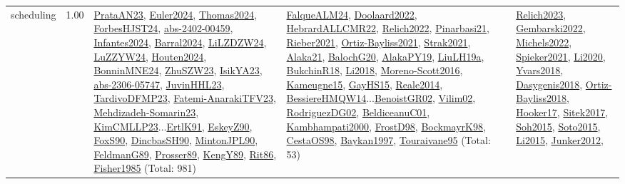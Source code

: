 {\begin{longtable}{p{3cm}r>{\raggedright\arraybackslash}p{6cm}>{\raggedright\arraybackslash}p{6cm}>{\raggedright\arraybackslash}p{8cm}}
\index{scheduling}\index{Scheduling!scheduling}scheduling &  1.00 & \hyperref[detail:PrataAN23]{PrataAN23}, \hyperref[detail:Euler2024]{Euler2024}, \hyperref[detail:Thomas2024]{Thomas2024}, \hyperref[detail:ForbesHJST24]{ForbesHJST24}, \hyperref[detail:abs-2402-00459]{abs-2402-00459}, \hyperref[detail:Infantes2024]{Infantes2024}, \hyperref[detail:Barral2024]{Barral2024}, \hyperref[detail:LiLZDZW24]{LiLZDZW24}, \hyperref[detail:LuZZYW24]{LuZZYW24}, \hyperref[detail:Houten2024]{Houten2024}, \hyperref[detail:BonninMNE24]{BonninMNE24}, \hyperref[detail:ZhuSZW23]{ZhuSZW23}, \hyperref[detail:IsikYA23]{IsikYA23}, \hyperref[detail:abs-2306-05747]{abs-2306-05747}, \hyperref[detail:JuvinHHL23]{JuvinHHL23}, \hyperref[detail:TardivoDFMP23]{TardivoDFMP23}, \hyperref[detail:Fatemi-AnarakiTFV23]{Fatemi-AnarakiTFV23}, \hyperref[detail:Mehdizadeh-Somarin23]{Mehdizadeh-Somarin23}, \hyperref[detail:KimCMLLP23]{KimCMLLP23}...\hyperref[detail:ErtlK91]{ErtlK91}, \hyperref[detail:EskeyZ90]{EskeyZ90}, \hyperref[detail:FoxS90]{FoxS90}, \hyperref[detail:DincbasSH90]{DincbasSH90}, \hyperref[detail:MintonJPL90]{MintonJPL90}, \hyperref[detail:FeldmanG89]{FeldmanG89}, \hyperref[detail:Prosser89]{Prosser89}, \hyperref[detail:KengY89]{KengY89}, \hyperref[detail:Rit86]{Rit86}, \hyperref[detail:Fisher1985]{Fisher1985} (Total: 981) & \hyperref[detail:FalqueALM24]{FalqueALM24}, \hyperref[detail:Doolaard2022]{Doolaard2022}, \hyperref[detail:HebrardALLCMR22]{HebrardALLCMR22}, \hyperref[detail:Relich2022]{Relich2022}, \hyperref[detail:Pinarbasi21]{Pinarbasi21}, \hyperref[detail:Rieber2021]{Rieber2021}, \hyperref[detail:Ortiz-Bayliss2021]{Ortiz-Bayliss2021}, \hyperref[detail:Strak2021]{Strak2021}, \hyperref[detail:Alaka21]{Alaka21}, \hyperref[detail:BalochG20]{BalochG20}, \hyperref[detail:AlakaPY19]{AlakaPY19}, \hyperref[detail:LiuLH19a]{LiuLH19a}, \hyperref[detail:BukchinR18]{BukchinR18}, \hyperref[detail:Li2018]{Li2018}, \hyperref[detail:Moreno-Scott2016]{Moreno-Scott2016}, \hyperref[detail:Kameugne15]{Kameugne15}, \hyperref[detail:GayHS15]{GayHS15}, \hyperref[detail:Reale2014]{Reale2014}, \hyperref[detail:BessiereHMQW14]{BessiereHMQW14}...\hyperref[detail:BenoistGR02]{BenoistGR02}, \hyperref[detail:Vilim02]{Vilim02}, \hyperref[detail:RodriguezDG02]{RodriguezDG02}, \hyperref[detail:BeldiceanuC01]{BeldiceanuC01}, \hyperref[detail:Kambhampati2000]{Kambhampati2000}, \hyperref[detail:FrostD98]{FrostD98}, \hyperref[detail:BockmayrK98]{BockmayrK98}, \hyperref[detail:CestaOS98]{CestaOS98}, \hyperref[detail:Baykan1997]{Baykan1997}, \hyperref[detail:Touraivane95]{Touraivane95} (Total: 53) & \hyperref[detail:Relich2023]{Relich2023}, \hyperref[detail:Gembarski2022]{Gembarski2022}, \hyperref[detail:Michels2022]{Michels2022}, \hyperref[detail:Spieker2021]{Spieker2021}, \hyperref[detail:Li2020]{Li2020}, \hyperref[detail:Yvars2018]{Yvars2018}, \hyperref[detail:Dasygenis2018]{Dasygenis2018}, \hyperref[detail:Ortiz-Bayliss2018]{Ortiz-Bayliss2018}, \hyperref[detail:Hooker17]{Hooker17}, \hyperref[detail:Sitek2017]{Sitek2017}, \hyperref[detail:Soh2015]{Soh2015}, \hyperref[detail:Soto2015]{Soto2015}, \hyperref[detail:Li2015]{Li2015}, \hyperref[detail:Junker2012]{Junker2012}, 
\end{longtable}}
